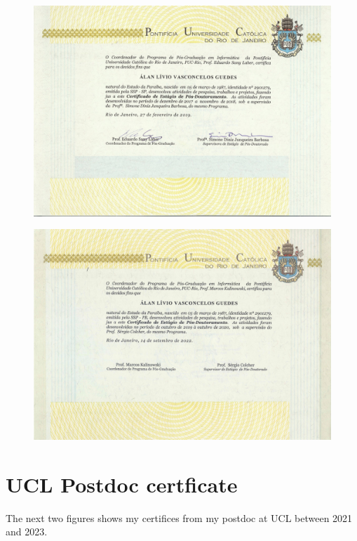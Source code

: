\documentclass[10pt,a4paper,sans,colorlinks]{moderncv}
\begin{document}
\begin{figure}
    \centering
    \includegraphics[align=t,width=\textwidth,height=0.3\paperheight, keepaspectratio=true]{certificates/postdoc-pucrio-2017-certificate.pdf}
\end{figure}

\begin{figure}
    \centering
    \includegraphics[align=t,width=\textwidth,height=0.3\paperheight, keepaspectratio=true]{certificates/postdoc-pucrio-2018-certificate.pdf}
\end{figure}

\newpage
\section{UCL Postdoc certficate}
The next two figures shows my certifices from my postdoc at UCL between 2021 and 2023.
\end{document}
